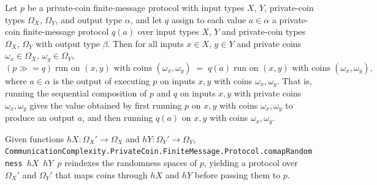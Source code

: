 \begin{theorem}
\label{CommunicationComplexity.PrivateCoin.FiniteMessage.Protocol.bind_rrun}
\leanok
{}
Let $p$ be a private-coin finite-message protocol with input types $X$, $Y$,
private-coin types $\Omega_X$, $\Omega_Y$, and output type $\alpha$, and let $q$ assign
to each value $a \in \alpha$ a private-coin finite-message protocol $q(a)$ over input
types $X$, $Y$ and private-coin types $\Omega_X$, $\Omega_Y$ with output type $\beta$.
Then for all inputs $x \in X$, $y \in Y$ and private coins $\omega_x \in \Omega_X$,
$\omega_y \in \Omega_Y$,
\[
  (p \mathbin{\gg\!=} q)\;\text{run on }(x,y)\text{ with coins }(\omega_x,\omega_y)
  \;=\;
  q(a)\;\text{run on }(x,y)\text{ with coins }(\omega_x,\omega_y),
\]
where $a \in \alpha$ is the output of executing $p$ on inputs $x, y$ with coins
$\omega_x, \omega_y$. That is, running the sequential composition of $p$ and $q$ on
inputs $x, y$ with private coins $\omega_x, \omega_y$ gives the value obtained by first
running $p$ on $x, y$ with coins $\omega_x, \omega_y$ to produce an output $a$, and then
running $q(a)$ on $x, y$ with coins $\omega_x, \omega_y$.
\end{theorem}

\begin{definition}
\label{CommunicationComplexity.PrivateCoin.FiniteMessage.Protocol.comapRandomness}
\leanok
{}
Given functions $hX : \Omega_X' \to \Omega_X$ and $hY : \Omega_Y' \to \Omega_Y$,
\texttt{CommunicationComplexity.PrivateCoin.FiniteMessage.Protocol.comapRandomness}~$hX$~$hY$~$p$ reindexes the randomness spaces of $p$, yielding
a protocol over $\Omega_X'$ and $\Omega_Y'$ that maps coins through $hX$ and $hY$
before passing them to $p$.
\end{definition}

